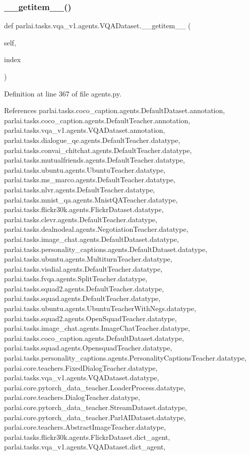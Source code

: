 \subsubsection{\texorpdfstring{\+\_\+\+\_\+getitem\+\_\+\+\_\+()}{\_\_getitem\_\_()}}
{\footnotesize\ttfamily def parlai.\+tasks.\+vqa\+\_\+v1.\+agents.\+V\+Q\+A\+Dataset.\+\_\+\+\_\+getitem\+\_\+\+\_\+ (\begin{DoxyParamCaption}\item[{}]{self,  }\item[{}]{index }\end{DoxyParamCaption})}



Definition at line 367 of file agents.\+py.



References parlai.\+tasks.\+coco\+\_\+caption.\+agents.\+Default\+Dataset.\+annotation, parlai.\+tasks.\+coco\+\_\+caption.\+agents.\+Default\+Teacher.\+annotation, parlai.\+tasks.\+vqa\+\_\+v1.\+agents.\+V\+Q\+A\+Dataset.\+annotation, parlai.\+tasks.\+dialogue\+\_\+qe.\+agents.\+Default\+Teacher.\+datatype, parlai.\+tasks.\+convai\+\_\+chitchat.\+agents.\+Default\+Teacher.\+datatype, parlai.\+tasks.\+mutualfriends.\+agents.\+Default\+Teacher.\+datatype, parlai.\+tasks.\+ubuntu.\+agents.\+Ubuntu\+Teacher.\+datatype, parlai.\+tasks.\+ms\+\_\+marco.\+agents.\+Default\+Teacher.\+datatype, parlai.\+tasks.\+nlvr.\+agents.\+Default\+Teacher.\+datatype, parlai.\+tasks.\+mnist\+\_\+qa.\+agents.\+Mnist\+Q\+A\+Teacher.\+datatype, parlai.\+tasks.\+flickr30k.\+agents.\+Flickr\+Dataset.\+datatype, parlai.\+tasks.\+clevr.\+agents.\+Default\+Teacher.\+datatype, parlai.\+tasks.\+dealnodeal.\+agents.\+Negotiation\+Teacher.\+datatype, parlai.\+tasks.\+image\+\_\+chat.\+agents.\+Default\+Dataset.\+datatype, parlai.\+tasks.\+personality\+\_\+captions.\+agents.\+Default\+Dataset.\+datatype, parlai.\+tasks.\+ubuntu.\+agents.\+Multiturn\+Teacher.\+datatype, parlai.\+tasks.\+visdial.\+agents.\+Default\+Teacher.\+datatype, parlai.\+tasks.\+fvqa.\+agents.\+Split\+Teacher.\+datatype, parlai.\+tasks.\+squad2.\+agents.\+Default\+Teacher.\+datatype, parlai.\+tasks.\+squad.\+agents.\+Default\+Teacher.\+datatype, parlai.\+tasks.\+ubuntu.\+agents.\+Ubuntu\+Teacher\+With\+Negs.\+datatype, parlai.\+tasks.\+squad2.\+agents.\+Open\+Squad\+Teacher.\+datatype, parlai.\+tasks.\+image\+\_\+chat.\+agents.\+Image\+Chat\+Teacher.\+datatype, parlai.\+tasks.\+coco\+\_\+caption.\+agents.\+Default\+Dataset.\+datatype, parlai.\+tasks.\+squad.\+agents.\+Opensquad\+Teacher.\+datatype, parlai.\+tasks.\+personality\+\_\+captions.\+agents.\+Personality\+Captions\+Teacher.\+datatype, parlai.\+core.\+teachers.\+Fixed\+Dialog\+Teacher.\+datatype, parlai.\+tasks.\+vqa\+\_\+v1.\+agents.\+V\+Q\+A\+Dataset.\+datatype, parlai.\+core.\+pytorch\+\_\+data\+\_\+teacher.\+Loader\+Process.\+datatype, parlai.\+core.\+teachers.\+Dialog\+Teacher.\+datatype, parlai.\+core.\+pytorch\+\_\+data\+\_\+teacher.\+Stream\+Dataset.\+datatype, parlai.\+core.\+pytorch\+\_\+data\+\_\+teacher.\+Parl\+A\+I\+Dataset.\+datatype, parlai.\+core.\+teachers.\+Abstract\+Image\+Teacher.\+datatype, parlai.\+tasks.\+flickr30k.\+agents.\+Flickr\+Dataset.\+dict\+\_\+agent, parlai.\+tasks.\+vqa\+\_\+v1.\+agents.\+V\+Q\+A\+Dataset.\+dict\+\_\+agent, 